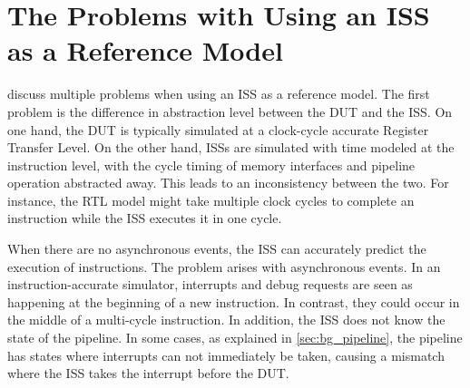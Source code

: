 %
%    



\section{The Problems with Using an ISS as a Reference Model}
\label{sec:back_issProblem}

\textcite{taylorAdvancedRISCVVerification2023}  discuss multiple problems when using an ISS as a reference model. The first problem is the difference in abstraction level between the DUT and the ISS. On one hand, the DUT is typically simulated at a clock-cycle accurate Register Transfer Level. On the other hand, ISSs are simulated with time modeled at the instruction level, with the cycle timing of memory interfaces and pipeline operation abstracted away. This leads to an inconsistency between the two. For instance, the RTL model might take multiple clock cycles to complete an instruction while the ISS executes it in one cycle.

When there are no asynchronous events, the ISS can accurately predict the execution of instructions. The problem arises with asynchronous events. In an instruction-accurate simulator, interrupts and debug requests are seen as happening at the beginning of a new instruction. In contrast, they could occur in the middle of a multi-cycle instruction. In addition, the ISS does not know the state of the pipeline. In some cases, as explained in \cref{sec:bg_pipeline}, the pipeline has states where interrupts can not immediately be taken, causing a mismatch where the ISS takes the interrupt before the DUT.

